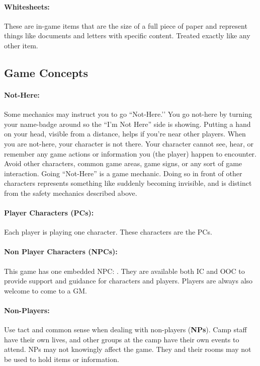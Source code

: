\documentclass[sheet]{GL2020}
\begin{document}
\paragraph{Whitesheets:} These are in-game items that are the size of a full piece of paper and represent things like documents and letters with specific content. Treated exactly like any other item.

\subsection{Game Concepts}

\paragraph{Not-Here:} Some mechanics may instruct you to go ``Not-Here.'’ You go not-here by turning your name-badge around so the ``I'm Not Here'' side is showing. Putting a hand on your head, visible from a distance, helps if you're near other players. When you are not-here, your character is not there.  Your character cannot see, hear, or remember any game actions or information you (the player) happen to encounter.  Avoid other characters, common game areas, game signs, or any sort of game interaction. Going ``Not-Here'' is a game mechanic. Doing so in front of other characters represents something like suddenly becoming invisible, and is distinct from the safety mechanics described above.

\paragraph{Player Characters (PCs):} Each player is playing one character. These characters are the PCs.

\paragraph{Non Player Characters (NPCs):} This game has one embedded NPC: \cPrincipal{\intro}. They are available both IC and OOC to provide support and guidance for characters and players. Players are always also welcome to come to a GM.

\paragraph{Non-Players:} Use tact and common sense when dealing with non-players ({\bf NPs}). Camp staff have their own lives, and other groups at the camp have their own events to attend. NPs may not knowingly affect the game. They and their rooms may not be used to hold items or information.
\end{document}
